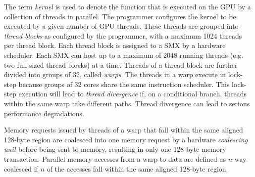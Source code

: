
The term \emph{kernel} is used to denote the function that is executed on the 
GPU by a collection of threads in parallel.
The programmer configures the kernel to be executed by a given number of GPU threads.
These threads are grouped into {\it thread blocks} as configured by the programmer, with a maximum
1024 threads per thread block.
Each thread block is assigned to a SMX by a hardware scheduler. 
Each SMX can host up to a maximum of 2048 running threads (e.g. two full-sized thread blocks) at a time.
Threads of a thread block are further divided into groups of 32, called \emph{warps}. 
The threads in a warp execute in lock-step 
because groups of 32 cores share the same instruction scheduler.
This lock-step execution will lead to {\it thread divergence} if,
on a conditional branch, threads within the same warp take different paths.
Thread divergence can lead to serious performance degradations. 

Memory requests issued by threads of a warp that fall within the same aligned 128-byte region are
coalesced into one memory request by a hardware \emph{coalescing unit} before being sent to memory, resulting in only one 128-byte memory transaction. 
Parallel memory accesses from a warp to data are defined as $n$-way coalesced if $n$ of the accesses fall
within the same aligned 128-byte region.




